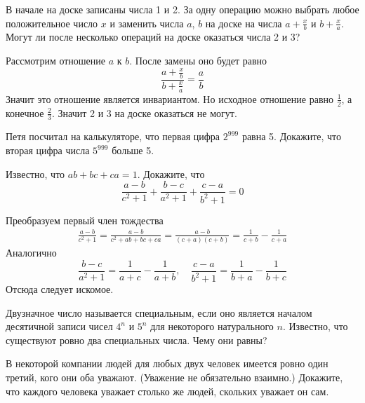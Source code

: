 \documentclass[11pt, a4paper]{common/document_template}
\begin{document}
\begin{exercise}
В начале на доске записаны числа 1 и 2. За одну операцию можно выбрать любое положительное число $x$ и заменить числа $a$, $b$ на доске на числа $a + \frac{x}{b}$ и $b + \frac{x}{a}$. Могут ли
после несколько операций на доске оказаться числа 2 и 3?
\end{exercise}

\begin{Solution}
Рассмотрим отношение $a$ к $b$. После замены оно будет равно
$$
\frac{a + \frac{x}{b}}{b + \frac{x}{a}} = \frac{a}{b}
$$
Значит это отношение является инвариантом. Но исходное отношение равно $\frac{1}{2}$, а конечное $\frac{2}{3}$. Значит 2 и 3 на доске оказаться не могут.
\end{Solution}

\begin{exercise}
Петя посчитал на калькуляторе, что первая цифра $2^{999}$ равна 5. Докажите, что вторая цифра числа $5^{999}$ больше 5.
\end{exercise}

\begin{exercise}
Известно, что $ab + bc + ca = 1$. Докажите, что
$$
\frac{a - b}{c^{2} + 1} + \frac{b - c}{a^{2} + 1} + \frac{c - a}{b^{2} + 1} = 0
$$
\end{exercise}

\begin{Solution}
Преобразуем первый член тождества
\begin{align*}
\frac{a - b}{c^{2} + 1} = \frac{a - b}{c^{2} + ab + bc + ca} = \frac{a - b}{(c + a)(c + b)} = \frac{1}{c + b} - \frac{1}{c + a}
\end{align*}
Аналогично
$$
\frac{b - c}{a^2 + 1} = \frac{1}{a + c} - \frac{1}{a + b}, \quad 
\frac{c - a}{b^2 + 1} = \frac{1}{b + a} - \frac{1}{b + c}
$$
Отсюда следует искомое.
\end{Solution}

\begin{exercise}
Двузначное число называется специальным, если оно является началом десятичной записи чисел $4^{n}$ и $5^{n}$ для некоторого натурального $n$. Известно, что существуют ровно два специальных числа. Чему они равны?
\end{exercise}

\begin{exercise}
В некоторой компании людей для любых двух человек имеется ровно один третий, кого они оба уважают. (Уважение не обязательно взаимно.) Докажите, что каждого человека уважает столько же людей, скольких уважает он сам.
\end{exercise}
\end{document}
